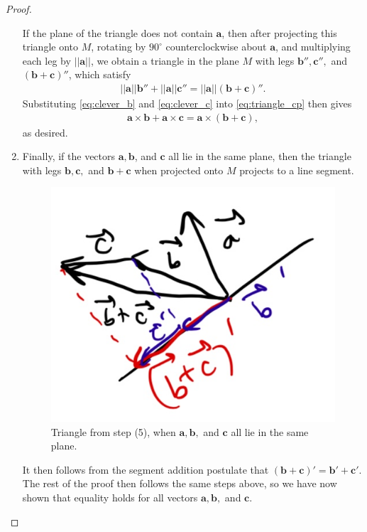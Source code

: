 \documentclass[12pt,letterpaper,reqno]{article}
\numberwithin{equation}{section}
\begin{document}
\begin{proof}
\begin{enumerate}[(1)]
		If the plane of the triangle does not contain $\mathbf{a}$, then after projecting this triangle onto $M$, rotating by $90^\circ$ counterclockwise about $\mathbf{a}$, and multiplying each leg by $||\mathbf{a}||$, we obtain a triangle in the plane $M$ with legs $\mathbf{b}'', \mathbf{c}'',$ and $(\mathbf{b}+\mathbf{c})''$, which satisfy
		\begin{align}\label{eq:triangle_cp}
			||\mathbf{a}||\mathbf{b}''+||\mathbf{a}||\mathbf{c}''=||\mathbf{a}||(\mathbf{b}+\mathbf{c})''.
		\end{align}
		Substituting \eqref{eq:clever_b} and \eqref{eq:clever_c} into \eqref{eq:triangle_cp} then gives
		\begin{align*}
			\mathbf{a} \times \mathbf{b}+\mathbf{a} \times \mathbf{c}=\mathbf{a} \times (\mathbf{b}+\mathbf{c}),
		\end{align*}
		as desired.
		\item Finally, if the vectors $\mathbf{a}, \mathbf{b}$, and $\mathbf{c}$ all lie in the same plane, then the triangle with legs $\mathbf{b}, \mathbf{c},$ and $\mathbf{b}+\mathbf{c}$ when projected onto $M$ projects to a line segment. 
		\begin{figure}[h]
		\begin{center}
			\includegraphics[scale=0.3]{figures_mvc/cp_proof_triangle_2}
		\end{center}
		\caption{Triangle from step (5), when $\mathbf{a}, \mathbf{b},$ and $\mathbf{c}$ all lie in the same plane.}
	\end{figure}
	
		It then follows from the segment addition postulate that $(\mathbf{b}+\mathbf{c})'=\mathbf{b}'+\mathbf{c}'$. The rest of the proof then follows the same steps above, so we have now shown that equality holds for all vectors $\mathbf{a}, \mathbf{b},$ and $\mathbf{c}$.
	\end{enumerate}
\end{proof}
\end{document}
